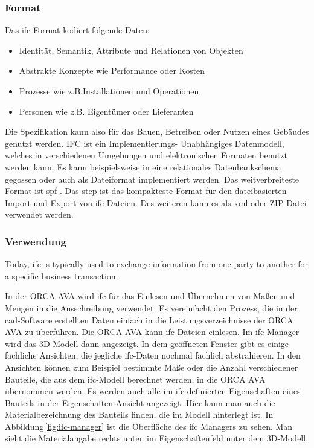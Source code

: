 \subsubsection{Format}
\label{s:basics:ifc:format}
Das \ac{ifc} Format kodiert folgende Daten:
\begin{itemize}
	\item Identität, Semantik, Attribute und Relationen von Objekten
	\item Abstrakte Konzepte wie Performance oder Kosten
	\item Prozesse wie z.B.Installationen und Operationen
	\item Personen wie z.B. Eigentümer oder Lieferanten
\end{itemize}
Die Spezifikation kann also für das Bauen, Betreiben oder Nutzen eines Gebäudes genutzt werden. IFC ist ein Implementierungs- Unabhängiges Datenmodell, welches in verschiedenen Umgebungen und elektronischen Formaten benutzt werden kann. Es kann beispielsweise in eine relationales Datenbankschema gegossen oder auch als Dateiformat implementiert werden. Das weitverbreiteste Format ist \ac{spf} \citep{Laakso2012-oi,BuildingSMART_IFC}. Das \ac{step} ist das kompakteste Format für den dateibasierten Import und Export von \ac{ifc}-Dateien. Des weiteren kann es als \ac{xml} oder ZIP Datei verwendet werden. \citep{BuildingSMART_IFC}


\subsubsection{Verwendung}
\label{s:basics:ifc:usage}
\begin{displayquote}
	Today, \ac{ifc} is typically used to exchange information from one party to another for a specific business transaction. \citep{BuildingSMART_IFC}
\end{displayquote}
In der ORCA AVA wird \ac{ifc} für das Einlesen und Übernehmen von Maßen und Mengen in die Ausschreibung verwendet. Es vereinfacht den Prozess, die in der \ac{cad}-Software erstellten Daten einfach in die Leistungsverzeichnisse der ORCA AVA zu überführen.
Die ORCA AVA kann \ac{ifc}-Dateien einlesen. Im \ac{ifc} Manager wird das 3D-Modell dann angezeigt. In dem geöffneten Fenster gibt es einige fachliche Ansichten, die jegliche \ac{ifc}-Daten nochmal fachlich abstrahieren. In den Ansichten können zum Beispiel bestimmte Maße oder die Anzahl verschiedener Bauteile, die aus dem \ac{ifc}-Modell berechnet werden, in die ORCA AVA übernommen werden.
Es werden auch alle im \ac{ifc} definierten Eigenschaften eines Bauteils in der Eigenschaften-Ansicht angezeigt. Hier kann man auch die Materialbezeichnung des Bauteils finden, die im Modell hinterlegt ist. In Abbildung\,\ref{fig:ifc-manager} ist die Oberfläche des \ac{ifc} Managers zu sehen. Man sieht die Materialangabe rechts unten im Eigenschaftenfeld unter dem 3D-Modell.

